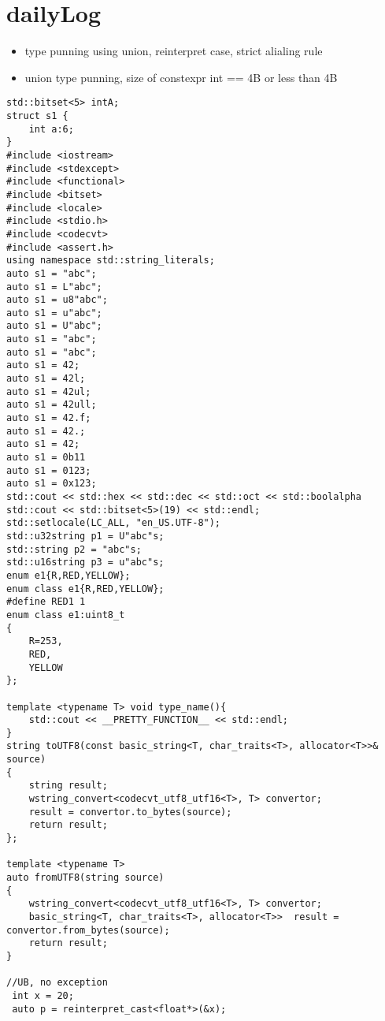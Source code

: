 \section{dailyLog} 

\begin{itemize}
    \item type punning using union, reinterpret case, strict alialing rule
    \item union type punning, size of constexpr int == 4B or less than 4B
\end{itemize}

\begin{lstlisting}
std::bitset<5> intA;
struct s1 {
    int a:6;
}
#include <iostream>
#include <stdexcept> 
#include <functional>
#include <bitset>
#include <locale>
#include <stdio.h>
#include <codecvt>
#include <assert.h>
using namespace std::string_literals;  
auto s1 = "abc";
auto s1 = L"abc";
auto s1 = u8"abc";
auto s1 = u"abc";
auto s1 = U"abc";
auto s1 = "abc";
auto s1 = "abc";
auto s1 = 42;
auto s1 = 42l;
auto s1 = 42ul;
auto s1 = 42ull;
auto s1 = 42.f;
auto s1 = 42.;
auto s1 = 42;
auto s1 = 0b11
auto s1 = 0123;
auto s1 = 0x123;
std::cout << std::hex << std::dec << std::oct << std::boolalpha
std::cout << std::bitset<5>(19) << std::endl;
std::setlocale(LC_ALL, "en_US.UTF-8");
std::u32string p1 = U"abc"s;
std::string p2 = "abc"s;
std::u16string p3 = u"abc"s;
enum e1{R,RED,YELLOW};
enum class e1{R,RED,YELLOW};
#define RED1 1
enum class e1:uint8_t
{
    R=253,
    RED,
    YELLOW
};

template <typename T> void type_name(){
    std::cout << __PRETTY_FUNCTION__ << std::endl;
}
string toUTF8(const basic_string<T, char_traits<T>, allocator<T>>& source)
{
    string result;
    wstring_convert<codecvt_utf8_utf16<T>, T> convertor;
    result = convertor.to_bytes(source);
    return result;
};

template <typename T>
auto fromUTF8(string source)
{
    wstring_convert<codecvt_utf8_utf16<T>, T> convertor;
    basic_string<T, char_traits<T>, allocator<T>>  result = convertor.from_bytes(source);
    return result;
}

//UB, no exception
 int x = 20;
 auto p = reinterpret_cast<float*>(&x);




\end{lstlisting}
